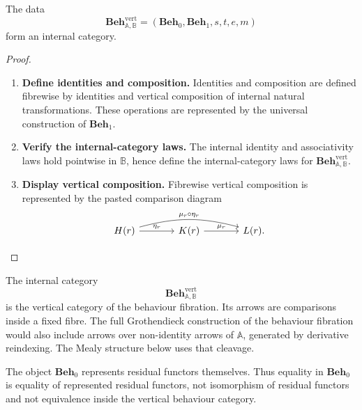 \begin{theorem}
\label{thm:internal-behaviour-category}
    The data
    \[
        \mathbf{Beh}^{\mathrm{vert}}_{\mathbb A,\mathbb B}
        =
        (\mathbf{Beh}_0,\mathbf{Beh}_1,s,t,e,m)
    \]
    form an internal category.
\end{theorem}
\begin{proof}
    \leavevmode
    \begin{enumerate}
        \item \textbf{Define identities and composition.} Identities and composition are defined fibrewise by identities and vertical composition of internal natural transformations. These operations are represented by the universal construction of \(\mathbf{Beh}_1\).

        \item \textbf{Verify the internal-category laws.} The internal identity and associativity laws hold pointwise in \(\mathbb B\), hence define the internal-category laws for \(\mathbf{Beh}^{\mathrm{vert}}_{\mathbb A,\mathbb B}\).

        \item \textbf{Display vertical composition.} Fibrewise vertical composition is represented by the pasted comparison diagram
        \[
            \begin{tikzcd}[column sep=large, row sep=large]
                    H(r)
                        \arrow[r, "\eta_r"]
                        \arrow[rr, "\mu_r\circ\eta_r", bend left=15]
                &
                    K(r)
                        \arrow[r, "\mu_r"]
                &
                    L(r).
            \end{tikzcd}
        \]
    \end{enumerate}
\end{proof}

\begin{remark}
\label{rem:vertical-not-total-fibration}
    The internal category
    \[
        \mathbf{Beh}^{\mathrm{vert}}_{\mathbb A,\mathbb B}
    \]
    is the vertical category of the behaviour fibration. Its arrows are comparisons inside a fixed fibre. The full Grothendieck construction of the behaviour fibration would also include arrows over non-identity arrows of \(\mathbb A\), generated by derivative reindexing. The Mealy structure below uses that cleavage.
\end{remark}

\begin{remark}
\label{rem:equality-of-behaviours}
    The object \(\mathbf{Beh}_0\) represents residual functors themselves. Thus equality in \(\mathbf{Beh}_0\) is equality of represented residual functors, not isomorphism of residual functors and not equivalence inside the vertical behaviour category.
\end{remark}


